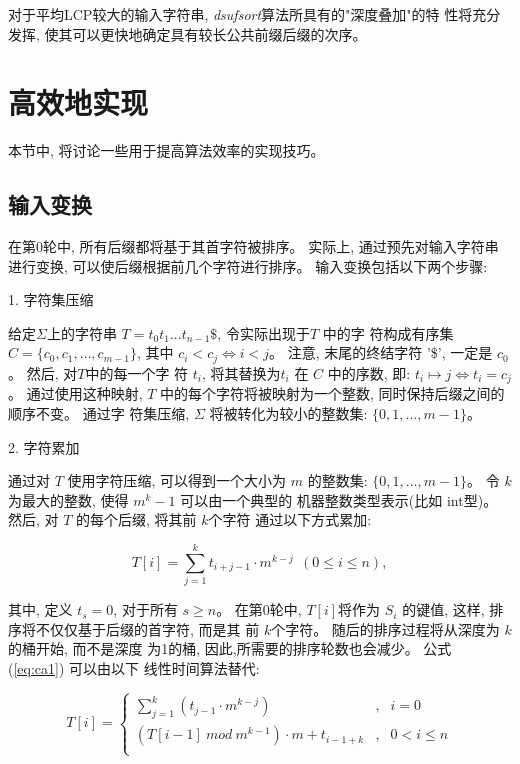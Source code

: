 对于平均LCP较大的输入字符串, \emph{dsufsort}算法所具有的"深度叠加"的特
性将充分发挥, 使其可以更快地确定具有较长公共前缀后缀的次序。


\section{高效地实现}
\label{sec:3_Implementation}

本节中, 将讨论一些用于提高算法效率的实现技巧。

\subsection{输入变换}

在第0轮中, 所有后缀都将基于其首字符被排序。 实际上, 通过预先对输入字符串
进行变换, 可以使后缀根据前几个字符进行排序。 输入变换包括以下两个步骤:

1. 字符集压缩

给定$\Sigma$上的字符串 $T = t_0t_1...t_{n-1}\$$, 令实际出现于$T$ 中的字
符构成有序集 $C = \{c_0, c_1,\dots, c_{m-1}\}$, 其中 $c_i < c_j \iff i
< j$。 注意, 末尾的终结字符 '\$', 一定是 $c_0$。 然后, 对$T$中的每一个字
符 $t_i$, 将其替换为$t_i$ 在 $C$ 中的序数, 即: $t_i \mapsto j \iff t_i
= c_j$。 通过使用这种映射,
$T$ 中的每个字符将被映射为一个整数, 同时保持后缀之间的顺序不变。 通过字
符集压缩, $\Sigma$ 将被转化为较小的整数集: $\{0,1,\dots,m-1\}$。

2. 字符累加

通过对 $T$ 使用字符压缩, 可以得到一个大小为 $m$ 的整数集:
$\{0,1,\dots,m-1\}$。 令 $k$ 为最大的整数, 使得 $m^k-1$ 可以由一个典型的
机器整数类型表示(比如 int型)。 然后, 对 $T$ 的每个后缀, 将其前 $k$个字符
通过以下方式累加:

\begin{equation}\label{eq:ca1}
  T[i] = \sum_{j=1}^k t_{i+j-1} \cdot m^{k-j}  ~~(0 \leq i \leq n),
\end{equation}

\noindent 其中, 定义 $t_s = 0$, 对于所有 $s \geq n$。 在第0轮中,
$T[i]$将作为 $S_i$ 的键值, 这样, 排序将不仅仅基于后缀的首字符, 而是其
前 $k$个字符。 随后的排序过程将从深度为 $k$的桶开始, 而不是深度
为1的桶, 因此,所需要的排序轮数也会减少。 公式 (\ref{eq:ca1}) 可以由以下
线性时间算法替代:

\begin{equation}\label{eq:ca2}
 T[i]  = \left\{
  \begin{array}{lll}
    \sum_{j=1}^{k}(t_{j-1} \cdot m^{k-j})  &,  &  i = 0\\
    (T[i-1]~ mod~m^{k-1}) \cdot m + t_{i-1+k} &,  & 0 < i \leq n \\
    \end{array}\right.
\end{equation}

